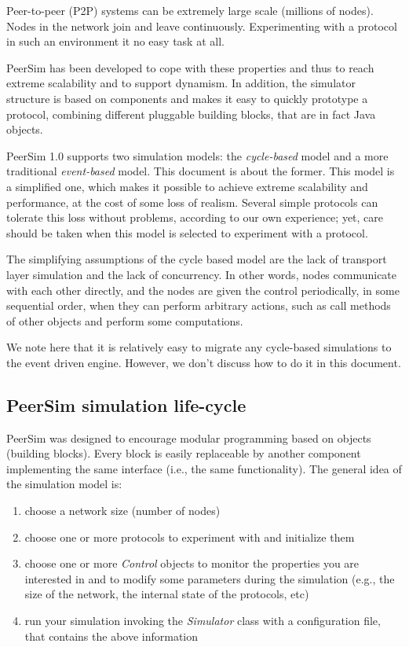 \documentclass[a4paper,11pt]{article}
\begin{document}
Peer-to-peer (P2P) systems can be extremely large
scale (millions of nodes).
Nodes in the network join and leave continuously.
Experimenting with a protocol in such an environment it no easy task at all.

PeerSim has been developed to cope with these properties and thus
to reach extreme scalability and to support dynamism. In addition,
the simulator structure is based on components and makes it easy to quickly
prototype a protocol, combining different pluggable building
blocks, that are in fact Java objects.

PeerSim 1.0 supports two simulation models: the {\em cycle-based} model
and a more traditional {\em event-based} model.
This document is about the former.
This model is a simplified one, which makes it possible to achieve extreme
scalability and performance, at the cost of some loss of realism.
Several simple protocols can tolerate this loss without problems, according
to our own experience; yet, care should be taken when this model is selected 
to experiment with a protocol.

The simplifying assumptions of the cycle based model are the lack of
transport layer simulation and the lack of concurrency.
In other words, nodes communicate with each other directly, and the nodes
are given the control periodically, in some sequential order, when they can
perform arbitrary actions, such as call methods of other objects and perform
some computations.

We note here that it is relatively easy to migrate any cycle-based simulations
to the event driven engine. However, we don't discuss how to do it in this
document.

\subsection{PeerSim simulation life-cycle}

PeerSim was designed to encourage modular programming based on objects
(building blocks). Every block is easily replaceable by another component
implementing the same interface (i.e., the same functionality).
The general idea of the simulation model is:

\begin{enumerate}
\item choose a network size (number of nodes) 
\item choose one or more protocols to experiment with and initialize
them
\item choose one or more \emph{Control} objects
  to monitor the properties
  you are interested in and to modify some parameters during
  the simulation (e.g., the size of the
 network, the internal state of the protocols, etc) 
\item run your simulation invoking the \emph{Simulator} class with a
configuration file, that contains the above information
\end{enumerate}
\end{document}

